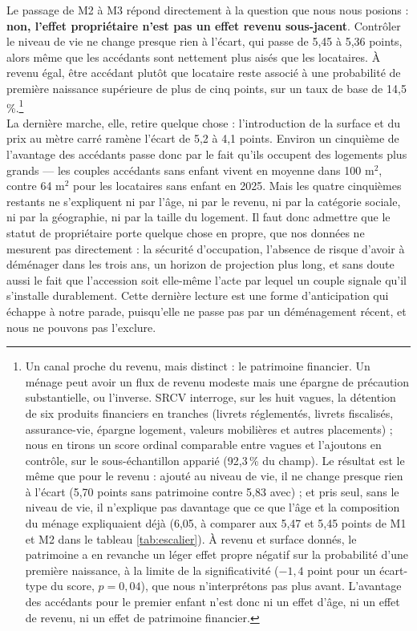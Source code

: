 \documentclass[12pt,a4paper]{article}
\begin{document}
\noindent Le passage de M2 à M3 répond directement à la question que nous nous posions : \textbf{non, l'effet propriétaire n'est pas un effet revenu sous-jacent}. Contrôler le niveau de vie ne change presque rien à l'écart, qui passe de 5,45 à 5,36 points, alors même que les accédants sont nettement plus aisés que les locataires. À revenu égal, être accédant plutôt que locataire reste associé à une probabilité de première naissance supérieure de plus de cinq points, sur un taux de base de 14,5\,\%.\footnote{Un canal proche du revenu, mais distinct : le patrimoine financier. Un ménage peut avoir un flux de revenu modeste mais une épargne de précaution substantielle, ou l'inverse. SRCV interroge, sur les huit vagues, la détention de six produits financiers en tranches (livrets réglementés, livrets fiscalisés, assurance-vie, épargne logement, valeurs mobilières et autres placements) ; nous en tirons un score ordinal comparable entre vagues et l'ajoutons en contrôle, sur le sous-échantillon apparié (92,3\,\% du champ). Le résultat est le même que pour le revenu : ajouté au niveau de vie, il ne change presque rien à l'écart (5,70 points sans patrimoine contre 5,83 avec) ; et pris seul, sans le niveau de vie, il n'explique pas davantage que ce que l'âge et la composition du ménage expliquaient déjà (6,05, à comparer aux 5,47 et 5,45 points de M1 et M2 dans le tableau \ref{tab:escalier}). À revenu et surface donnés, le patrimoine a en revanche un léger effet propre négatif sur la probabilité d'une première naissance, à la limite de la significativité ($-1{,}4$ point pour un écart-type du score, $p = 0{,}04$), que nous n'interprétons pas plus avant. L'avantage des accédants pour le premier enfant n'est donc ni un effet d'âge, ni un effet de revenu, ni un effet de patrimoine financier.} \\

\noindent La dernière marche, elle, retire quelque chose : l'introduction de la surface et du prix au mètre carré ramène l'écart de 5,2 à 4,1 points. Environ un cinquième de l'avantage des accédants passe donc par le fait qu'ils occupent des logements plus grands — les couples accédants sans enfant vivent en moyenne dans 100 m$^2$, contre 64 m$^2$ pour les locataires sans enfant en 2025. Mais les quatre cinquièmes restants ne s'expliquent ni par l'âge, ni par le revenu, ni par la catégorie sociale, ni par la géographie, ni par la taille du logement. Il faut donc admettre que le statut de propriétaire porte quelque chose en propre, que nos données ne mesurent pas directement : la sécurité d'occupation, l'absence de risque d'avoir à déménager dans les trois ans, un horizon de projection plus long, et sans doute aussi le fait que l'accession soit elle-même l'acte par lequel un couple signale qu'il s'installe durablement. Cette dernière lecture est une forme d'anticipation qui échappe à notre parade, puisqu'elle ne passe pas par un déménagement récent, et nous ne pouvons pas l'exclure.
\end{document}
